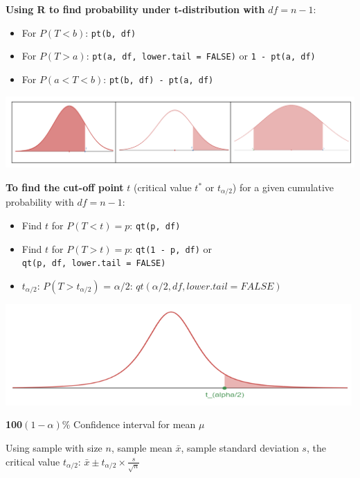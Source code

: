 \documentclass[
]{book}
\providecommand{\tightlist}{%
  \setlength{\itemsep}{0pt}\setlength{\parskip}{0pt}}
\begin{document}
\textbf{Using R to find probability under t-distribution with} \(df=n-1\):

\begin{itemize}
\tightlist
\item
  For \(P(T < b)\): \texttt{pt(b,\ df)}
\item
  For \(P(T > a)\): \texttt{pt(a,\ df,\ lower.tail\ =\ FALSE)} or \texttt{1\ -\ pt(a,\ df)}
\item
  For \(P(a < T < b)\): \texttt{pt(b,\ df)\ -\ pt(a,\ df)}
\end{itemize}

\includegraphics[width=5.72917in,height=\textheight]{images/img53.png}

\textbf{To find the cut-off point} \(t\) (critical value \(t^*\) or \(t_{\alpha/2}\)) for a given cumulative probability with \(df=n-1\):

\begin{itemize}
\tightlist
\item
  Find \(t\) for \(P(T < t) = p\): \texttt{qt(p,\ df)}
\item
  Find \(t\) for \(P(T > t) = p\): \texttt{qt(1\ -\ p,\ df)} or \texttt{qt(p,\ df,\ lower.tail\ =\ FALSE)}
\item
  \(t_{\alpha/2}\): \(P(T > t_{\alpha/2})\) = \(\alpha/2\): \(qt(\alpha/2, df, lower.tail = FALSE)\)
\end{itemize}

\includegraphics[width=5.20833in,height=\textheight]{images/img54.png}

\textbf{100}\((1-\alpha)\%\) Confidence interval for mean \(\mu\)

Using sample with size \(n\), sample mean \(\bar{x}\), sample standard deviation \(s\), the critical value \(t_{\alpha/2}\): \(\bar{x} \pm t_{\alpha/2} \times \frac{s}{\sqrt{n}}\)
\end{document}
